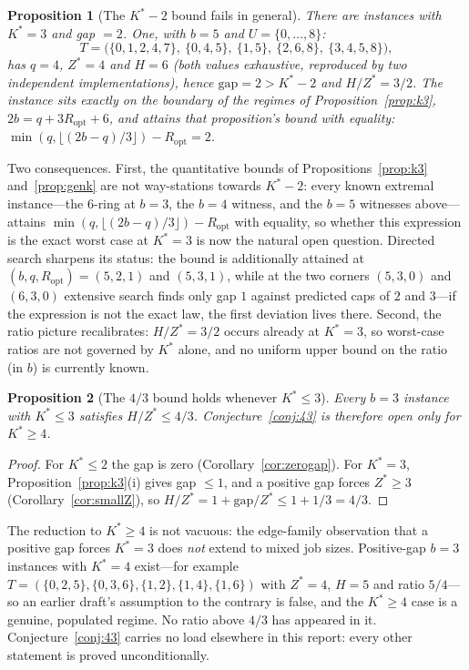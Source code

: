\documentclass[11pt,a4paper]{article}
\theoremstyle{plain}
\newtheorem{proposition}{Proposition}
\theoremstyle{definition}
\theoremstyle{remark}
\newcommand{\U}{U}
\newcommand{\Kst}{K^{\ast}}
\newcommand{\Zst}{Z^{\ast}}
\begin{document}
\begin{proposition}[The $\Kst-2$ bound fails in general]\label{prop:refute}
There are instances with $\Kst=3$ and gap $=2$. One, with $b=5$ and
$\U=\{0,\dots,8\}$:
\[
  T=\bigl(\{0,1,2,4,7\},\ \{0,4,5\},\ \{1,5\},\ \{2,6,8\},\ \{3,4,5,8\}\bigr),
\]
has $q=4$, $\Zst=4$ and $H=6$ (both values exhaustive, reproduced by two
independent implementations), hence $\mathrm{gap}=2>\Kst-2$ and $H/\Zst=3/2$.
The instance sits exactly on the boundary of the regimes of
Proposition~\ref{prop:k3}, $2b=q+3R_{\mathrm{opt}}+6$, and attains that
proposition's bound with equality:
$\min(q,\lfloor(2b-q)/3\rfloor)-R_{\mathrm{opt}}=2$.
\end{proposition}
\noindent Two consequences. First, the quantitative bounds of
Propositions~\ref{prop:k3} and~\ref{prop:genk} are not way-stations towards
$\Kst-2$: every known extremal instance---the $6$-ring at $b=3$, the $b=4$
witness, and the $b=5$ witnesses above---attains
$\min(q,\lfloor(2b-q)/3\rfloor)-R_{\mathrm{opt}}$ with equality, so whether
this expression is the exact worst case at $\Kst=3$ is now the natural open
question. Directed search sharpens its status: the bound is additionally
attained at $(b,q,R_{\mathrm{opt}})=(5,2,1)$ and $(5,3,1)$, while at the two
corners $(5,3,0)$ and $(6,3,0)$ extensive search finds only gap $1$ against
predicted caps of $2$ and $3$---if the expression is not the exact law, the
first deviation lives there. Second, the ratio picture recalibrates: $H/\Zst=3/2$ occurs already
at $\Kst=3$, so worst-case ratios are not governed by $\Kst$ alone, and no
uniform upper bound on the ratio (in $b$) is currently known.

\begin{proposition}[The $4/3$ bound holds whenever $\Kst\le3$]\label{prop:43route}
Every $b=3$ instance with $\Kst\le3$ satisfies $H/\Zst\le4/3$.
Conjecture~\ref{conj:43} is therefore open only for $\Kst\ge4$.
\end{proposition}
\begin{proof}
For $\Kst\le2$ the gap is zero (Corollary~\ref{cor:zerogap}). For $\Kst=3$,
Proposition~\ref{prop:k3}(i) gives gap $\le1$, and a positive gap forces
$\Zst\ge3$ (Corollary~\ref{cor:smallZ}), so
$H/\Zst=1+\mathrm{gap}/\Zst\le1+1/3=4/3$.
\end{proof}
\noindent The reduction to $\Kst\ge4$ is not vacuous: the edge-family
observation that a positive gap forces $\Kst=3$ does \emph{not} extend to
mixed job sizes. Positive-gap $b=3$ instances with $\Kst=4$ exist---for
example $T=(\{0,2,5\},\{0,3,6\},\{1,2\},\{1,4\},\{1,6\})$ with $\Zst=4$,
$H=5$ and ratio $5/4$---so an earlier draft's assumption to the contrary is
false, and the $\Kst\ge4$ case is a genuine, populated regime. No ratio above
$4/3$ has appeared in it. Conjecture~\ref{conj:43} carries no load elsewhere
in this report: every other statement is proved unconditionally.
\end{document}
